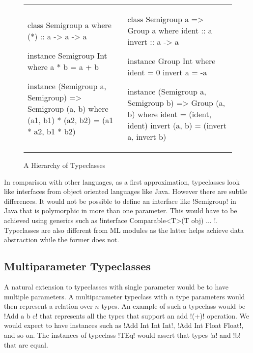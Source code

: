 \documentclass[format=sigplan,manuscript,review,screen, nonacm]{acmart}
\begin{document}
\begin{figure}[ht]
  \begin{tabular}{l l}
    \begin{code}
      class Semigroup a where
          (*)    :: a -> a -> a

      instance Semigroup Int where
          a * b = a + b

      instance (Semigroup a, Semigroup)
          => Semigroup (a, b) where
          (a1, b1) * (a2, b2) = (a1 * a2, b1 * b2)
    \end{code}&%
    \begin{code}
      class Semigroup a => Group a where
          ident  :: a
          invert :: a -> a
      
      instance Group Int where
          ident   = 0
          invert a = -a 

      instance (Semigroup a, Semigroup b)
          => Group (a, b) where
          ident  = (ident, ident)
          invert (a, b) = (invert a, invert b)
    \end{code}
  \end{tabular}
  \caption{A Hierarchy of Typeclasses}
  \label{fig:type-class-hierarchy}
\end{figure}

In comparison with other languages, as a first approximation, typeclasses look like interfaces from
object oriented languages like Java. However there are subtle differences. It would not be possible
to define an interface like !Semigroup! in Java that is polymorphic in more than one parameter.
This would have to be achieved using generics such as !interface Comparable<T>(T obj) { ... }!.
Typeclasses are also different from ML modules as the latter helps achieve data abstraction while the former does not.

\subsection{Multiparameter Typeclasses}
A natural extension to typeclasses with single parameter would be to have multiple parameters.
A multiparameter typeclass with $n$ type parameters would then represent a relation over $n$ types.
An example of such a typeclass would be !Add a b c! that represents
all the types that support an add !(+)! operation. We would expect to have instances such as !Add Int Int Int!, 
!Add Int Float Float!, and so on. The instances of typeclass !TEq! would assert that types !a! and !b! that are equal.
\end{document}
